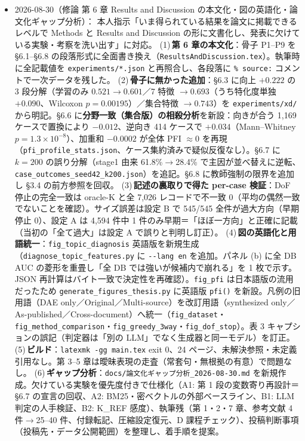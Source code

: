 \documentclass[11pt,a4paper]{jsarticle}
\begin{document}
\begin{itemize}[nosep]
  \item 2026-08-30（修論 第 6 章 Results and Discussion の本文化・図の英語化・論文化ギャップ分析）：
    本人指示「いま得られている結果を論文に掲載できるレベルで Methods と Results and Discussion の形に文書化し、発表に欠けている実験・考察を洗い出す」に対応。
    (1)\,\textbf{第 6 章の本文化}：骨子 P1--P9 を \S6.1--\S6.8 の段落形式に全面書き換え（\texttt{ResultsAndDiscussion.tex}）。執筆時に全記載値を \texttt{experiments/*.json} と再照合し、各段落に \texttt{\% source:} コメントで一次データを残した。
    (2)\,\textbf{骨子に無かった追加}：\S6.3 に向上 $+0.222$ の 3 段分解（学習のみ $0.521\to0.601$／7 特徴 $\to0.693$（うち特化度単独 $+0.090$、Wilcoxon $p=0.00195$）／集合特徴 $\to0.743$）を \texttt{experiments/xd/} から明記。\S6.6 に\textbf{分野一致（集合版）の相殺分析}を新設：向きが合う 1{,}169 ケースで置換により $-0.012$、逆向き 414 ケースで $+0.034$（Mann--Whitney $p=1.3\times10^{-8}$）、加重和 $-0.0002$ が全体 PFI $\approx 0$ を再現（\texttt{pfi\_profile\_stats.json}、ケース集約済みで疑似反復なし）。\S6.7 に $k=200$ の誤り分解（stage1 由来 61.8\%$\to$28.4\% で主因が並べ替えに逆転、\texttt{case\_outcomes\_seed42\_k200.json}）を追記。\S6.8 に教師強制の限界を追加し \S3.4 の前方参照を回収。
    (3)\,\textbf{記述の裏取りで得た per-case 検証}：DoF 停止の完全一致は oracle-K と全 7{,}026 レコードで不一致 0（平均の偶然一致でないことを確認）。サイズ誤差は設定 B で 545/545 全件が過大方向（早期停止 0）、設定 A は 4{,}594 件中 1 件のみ早期＝「ほぼ一方向」と正確に記載（当初の「全て過大」は設定 A で誤りと判明し訂正）。
    (4)\,\textbf{図の英語化と用語統一}：\texttt{fig\_topic\_diagnosis} 英語版を新規生成（\texttt{diagnose\_topic\_features.py} に \texttt{-{}-lang en} を追加。パネル (b) に全 DB AUC の菱形を重畳し「全 DB では強いが候補内で崩れる」を 1 枚で示す。JSON 再計算はバイト一致で決定性を再確認）。\texttt{fig\_pfi} は日本語版の流用だったため \texttt{generate\_figures\_thesis.py} に英語版 \texttt{pfi()} を新設。凡例の旧用語（DAE only／Original／Multi-source）を改訂用語（synthesized only／As-published／Cross-document）へ統一（\texttt{fig\_dataset}・\texttt{fig\_method\_comparison}・\texttt{fig\_greedy\_3way}・\texttt{fig\_dof\_stop}）。表 3 キャプションの誤記（判定器は「別の LLM」でなく生成器と同一モデル）を訂正。
    (5)\,\textbf{ビルド}：\texttt{latexmk -gg main.tex} exit 0、24 ページ、未解決参照・未定義引用なし。第 3--5 章は曖昧表現の走査（常套句・無根拠の有意）で問題なし。
    (6)\,\textbf{ギャップ分析}：\texttt{docs/論文化ギャップ分析\_2026-08-30.md} を新規作成。欠けている実験を優先度付きで仕様化（A1: 第 1 段の変数寄り再設計＝\S6.7 の宣言の回収、A2: BM25・密ベクトルの外部ベースライン、B1: LLM 判定の人手検証、B2: K\_REF 感度）、執筆残（第 1・2・7 章、参考文献 4 件$\to$25--40 件、付録転記、圧縮設定復元、D 課程チェック）、投稿判断事項（投稿先・データ公開範囲）を整理し、着手順を提案。

\end{itemize}
\end{document}
